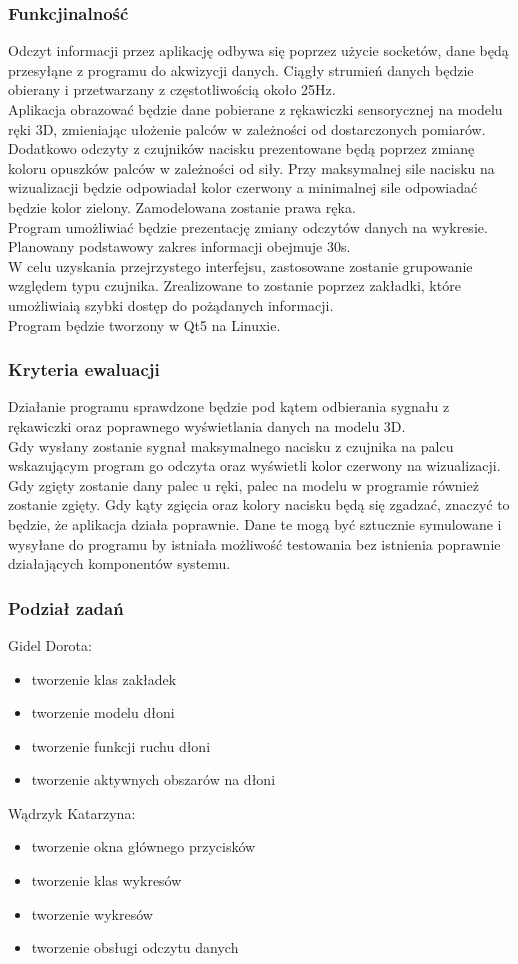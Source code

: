 \documentclass{article}
\begin{document}
\subsubsection{Funkcjinalność}
Odczyt informacji przez aplikację odbywa się poprzez użycie socketów, dane będą przesyłąne z programu do akwizycji danych. Ciągły strumień danych będzie obierany i przetwarzany z częstotliwością około 25Hz.\\
Aplikacja obrazować będzie dane pobierane z rękawiczki sensorycznej na modelu ręki 3D, zmieniając ułożenie palców w zależności od dostarczonych pomiarów. Dodatkowo odczyty z czujników nacisku prezentowane będą poprzez zmianę koloru opuszków palców w zależności od siły. Przy maksymalnej sile nacisku na wizualizacji będzie odpowiadał kolor czerwony a minimalnej sile odpowiadać będzie kolor zielony. Zamodelowana zostanie prawa ręka.\\
Program umożliwiać będzie prezentację zmiany odczytów danych na wykresie. Planowany podstawowy zakres informacji obejmuje 30s. \\
W celu uzyskania przejrzystego interfejsu, zastosowane zostanie grupowanie względem typu czujnika. Zrealizowane to zostanie poprzez zakładki, które umożliwiaią szybki dostęp do pożądanych informacji. \\
Program będzie tworzony w Qt5 na Linuxie.
\subsubsection{Kryteria ewaluacji}
Działanie programu sprawdzone będzie pod kątem odbierania sygnału z rękawiczki oraz poprawnego wyświetlania danych na modelu 3D. \\
Gdy wysłany zostanie sygnał maksymalnego nacisku z czujnika na palcu wskazującym program go odczyta oraz wyświetli kolor czerwony na wizualizacji. Gdy zgięty zostanie dany palec u ręki, palec na modelu w programie również zostanie zgięty. Gdy kąty zgięcia oraz kolory nacisku będą się zgadzać, znaczyć to będzie, że aplikacja działa poprawnie. Dane te mogą być sztucznie symulowane i wysyłane do programu by istniała możliwość testowania bez istnienia poprawnie działających komponentów systemu.
\subsubsection{Podział zadań}
Gidel Dorota:
\begin{itemize}
    \item tworzenie klas zakładek
    \item tworzenie modelu dłoni
    \item tworzenie funkcji ruchu dłoni
    \item tworzenie aktywnych obszarów na dłoni
\end{itemize}
Wądrzyk Katarzyna:
\begin{itemize}
    \item tworzenie okna głównego przycisków
    \item tworzenie klas wykresów
    \item tworzenie wykresów
    \item tworzenie obsługi odczytu danych
\end{itemize}
\end{document}
